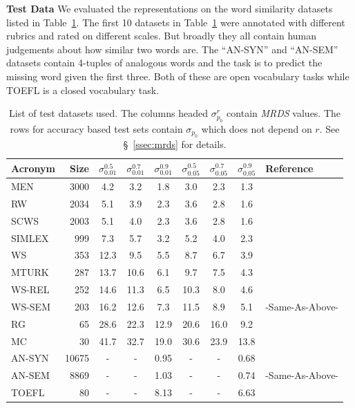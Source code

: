 \documentclass[11pt]{article}
\begin{document}
\noindent\textbf{Test Data} We evaluated the representations on the
word similarity datasets listed in Table~\ref{tab:testlist}. The first
10 datasets in Table~\ref{tab:testlist} were annotated with different
rubrics and rated on different scales. But broadly they all
contain human judgements about how similar two words are.
The ``AN-SYN'' and ``AN-SEM'' datasets contain 4-tuples of
analogous words and the task is to predict the missing word given the
first three. Both of these are  open vocabulary tasks while TOEFL is a closed
vocabulary task.
\begin{table}[ht]
  \centering
  \begin{tabular}{lr | ccc  | ccc | l}
    Acronym & Size  &
    $\sigma_{0.01}^{0.5}$ & $\sigma_{0.01}^{0.7}$ & $\sigma_{0.01}^{0.9}$ &
    $\sigma_{0.05}^{0.5}$ & $\sigma_{0.05}^{0.7}$ & $\sigma_{0.05}^{0.9}$ &
    Reference  \\
    \hline

    MEN    & 3000  & 4.2  & 3.2  & 1.8  & 3.0  & 2.3  & 1.3  & \cite{bruni2012distributional}  \\
    RW     & 2034  & 5.1  & 3.9  & 2.3  & 3.6  & 2.8  & 1.6  & \cite{Luong2013morpho}          \\
    SCWS   & 2003  & 5.1  & 4.0  & 2.3  & 3.6  & 2.8  & 1.6  & \cite{Huang2012Improving}       \\
    SIMLEX & 999   & 7.3  & 5.7  & 3.2  & 5.2  & 4.0  & 2.3  & \cite{hill2014simlex}           \\
    WS     & 353   & 12.3 & 9.5  & 5.5  & 8.7  & 6.7  & 3.9  & \cite{finkelstein2001placing}   \\
    MTURK  & 287   & 13.7 & 10.6 & 6.1  & 9.7  & 7.5  & 4.3  & \cite{Radinsky2011word}         \\
    WS-REL & 252   & 14.6 & 11.3 & 6.5  & 10.3 & 8.0  & 4.6  & \cite{agirre2009study}          \\
    WS-SEM & 203   & 16.2 & 12.6 & 7.3  & 11.5 & 8.9  & 5.1  & -Same-As-Above-                 \\
    RG     & 65    & 28.6 & 22.3 & 12.9 & 20.6 & 16.0 & 9.2  & \cite{Rubenstein1965Contextual} \\
    MC     & 30    & 41.7 & 32.7 & 19.0 & 30.6 & 23.9 & 13.8 & \cite{miller1991contextual}     \\ \hline
    AN-SYN  & 10675 & -    & -    & 0.95 & -    & -    & 0.68 & \cite{mikolov2013distributed}   \\
    AN-SEM  & 8869  & -    & -    & 1.03 & -    & -    & 0.74 & -Same-As-Above-                 \\
    TOEFL  & 80    & -    & -    & 8.13 & -    & -    & 6.63 & \cite{landauer1997solution}
  \end{tabular}
  \caption{List of test datasets used. The columns headed $\sigma_{p_0}^r$ contain
    \emph{MRDS}
    values. The rows for accuracy based test sets contain
    $\sigma_{p_0}$ which does not depend on $r$. See
    \S~\ref{ssec:mrds} for details.}
   \label{tab:testlist}
\end{table}
\end{document}
